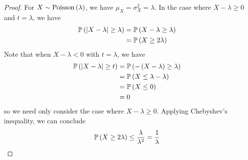 \documentclass[a4paper]{article}
\begin{document}
\begin{proof}[Proof] 
For \(X \sim \operatorname{Poisson}\left( \lambda  \right)\), we have \(\mu_{X} = \sigma_{X}^{2} = \lambda \). In the case where \(X - \lambda \ge 0\) and \(t = \lambda \), we have
\begin{align*}
	\Prob\left( \abs{X - \lambda} \ge \lambda \right) & = \Prob\left( X - \lambda \ge \lambda  \right) \\
	 & = \Prob\left( X \ge 2 \lambda  \right) \\ 
\end{align*}
Note that when \(X - \lambda < 0\) with \(t = \lambda \), we have
\begin{align*}
	\Prob\left( \abs{X - \lambda} \ge t \right) & = \Prob\left( -\left( X - \lambda  \right) \ge \lambda  \right)  \\
	 & = \Prob\left( X \le \lambda - \lambda  \right) \\
	 & = \Prob\left( X \le 0 \right) \\
	 & = 0
\end{align*}
so we need only consider the case where \(X - \lambda \ge 0\). Applying Chebyshev's inequality, we can conclude
\[
	\mathbb{P}\left( X \ge 2 \lambda  \right) \le \frac{\lambda }{\lambda^{2}} = \frac{1}{\lambda }
\]
\end{proof}
\end{document}
